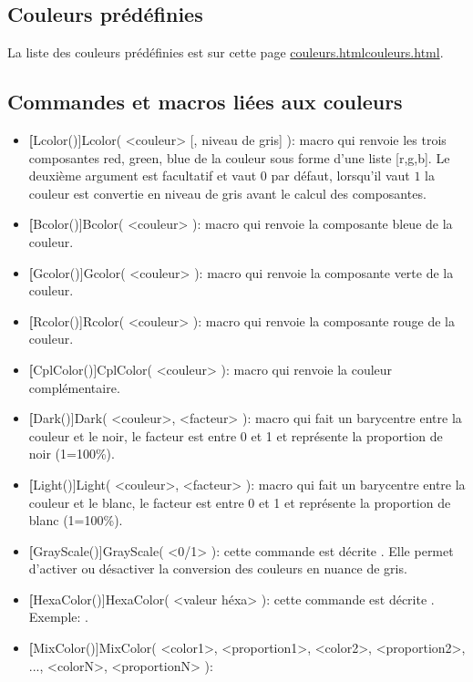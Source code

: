 \subsection{Couleurs prédéfinies}

La liste des couleurs prédéfinies est sur cette
page \ifhtml\url{couleurs.html}\else\href{run:html/couleurs.html}{couleurs.html}\fi.


\subsection{Commandes et macros liées aux couleurs}

\begin{itemize}
\item \textbf[Lcolor()]{Lcolor( <couleur> [, niveau de gris] )}: macro qui renvoie les trois composantes red, green,
blue de la couleur sous forme d'une liste [r,g,b]. Le deuxième argument est facultatif et vaut $0$ par défaut, lorsqu'il
vaut $1$ la couleur est convertie en niveau de gris avant le calcul des composantes.
\item \textbf[Bcolor()]{Bcolor( <couleur> )}: macro qui renvoie la composante bleue de la couleur.
\item \textbf[Gcolor()]{Gcolor( <couleur> )}: macro qui renvoie la composante verte de la couleur.
\item \textbf[Rcolor()]{Rcolor( <couleur> )}: macro qui renvoie la composante rouge de la couleur.
\item \textbf[CplColor()]{CplColor( <couleur> )}: macro qui renvoie la couleur complémentaire.
\item \textbf[Dark()]{Dark( <couleur>, <facteur> )}: macro qui fait un barycentre entre la couleur et le noir, le
facteur est entre 0 et 1 et représente la proportion de noir (1=100\%).
\item \textbf[Light()]{Light( <couleur>, <facteur> )}: macro qui fait un barycentre entre la couleur et le blanc, le
facteur est entre 0 et 1 et représente la proportion de blanc (1=100\%).
\item \textbf[GrayScale()]{GrayScale( <0/1> )}: cette commande est décrite . Elle permet
d'activer ou désactiver la conversion des couleurs en nuance de gris.
\item \textbf[HexaColor()]{HexaColor( <valeur héxa> )}:  cette commande est décrite .
Exemple: .
\item \textbf[MixColor()]{MixColor( <color1>, <proportion1>, <color2>, <proportion2>, ..., <colorN>, <proportionN> )}:

\end{itemize}
